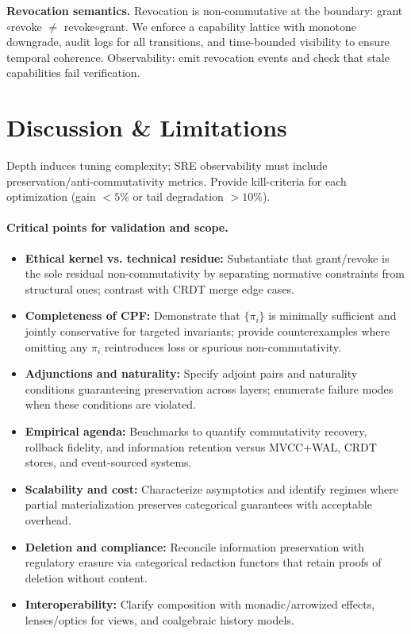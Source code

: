 \documentclass[10pt]{article}
\begin{document}
\textbf{Revocation semantics.} Revocation is non-commutative at the boundary: grant$\circ$revoke $\ne$ revoke$\circ$grant. We enforce a capability lattice with monotone downgrade, audit logs for all transitions, and time-bounded visibility to ensure temporal coherence. Observability: emit revocation events and check that stale capabilities fail verification.

\section{Discussion \& Limitations}
Depth induces tuning complexity; SRE observability must include preservation/anti-commutativity metrics.
Provide kill-criteria for each optimization (gain $<\!5\%$ or tail degradation $>\!10\%$).

\paragraph{Critical points for validation and scope.}
\begin{itemize}[nosep,leftmargin=*]
    \item \textbf{Ethical kernel vs. technical residue:} Substantiate that grant/revoke is the sole residual non-commutativity by separating normative constraints from structural ones; contrast with CRDT merge edge cases.
    \item \textbf{Completeness of CPF:} Demonstrate that $\{\pi_i\}$ is minimally sufficient and jointly conservative for targeted invariants; provide counterexamples where omitting any $\pi_i$ reintroduces loss or spurious non-commutativity.
    \item \textbf{Adjunctions and naturality:} Specify adjoint pairs and naturality conditions guaranteeing preservation across layers; enumerate failure modes when these conditions are violated.
    \item \textbf{Empirical agenda:} Benchmarks to quantify commutativity recovery, rollback fidelity, and information retention versus MVCC+WAL, CRDT stores, and event-sourced systems.
    \item \textbf{Scalability and cost:} Characterize asymptotics and identify regimes where partial materialization preserves categorical guarantees with acceptable overhead.
    \item \textbf{Deletion and compliance:} Reconcile information preservation with regulatory erasure via categorical redaction functors that retain proofs of deletion without content.
    \item \textbf{Interoperability:} Clarify composition with monadic/arrowized effects, lenses/optics for views, and coalgebraic history models.
\end{itemize}
\end{document}
